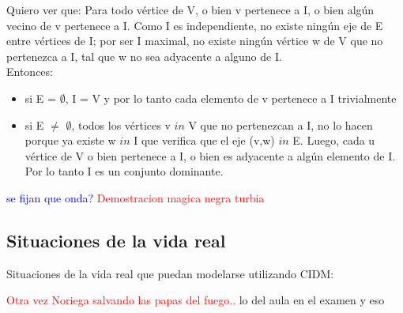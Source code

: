 Quiero ver que:
Para todo v\'ertice de V, o bien v pertenece a I, o bien alg\'un vecino de v pertenece a I.
Como I es independiente, no existe ning\'un eje de E entre v\'ertices de I; por ser I maximal, no existe ning\'un v\'ertice w de V que no pertenezca a I, tal que w no sea adyacente a alguno de I.\\
Entonces:
\begin{itemize}
\item si E = $\emptyset$, I = V y por lo tanto cada elemento de v pertenece a I trivialmente
\item si E $\neq$ $\emptyset$, todos los v\'ertices v $in$ V que no pertenezcan a I, no lo hacen porque ya existe w $in$ I que verifica que el eje (v,w) $in$ E. Luego, cada u v\'ertice de V o bien pertenece a I, o bien es adyacente a alg\'un elemento de I. Por lo tanto I es un conjunto dominante.
\end{itemize}
\textcolor{blue}{se fijan que onda?}
\textcolor{red}{Demostracion magica negra turbia}

\subsection{Situaciones de la vida real}

Situaciones de la vida real que puedan modelarse utilizando CIDM:

\textcolor{red}{Otra vez Noriega salvando las papas del fuego..} lo del aula en el examen y eso